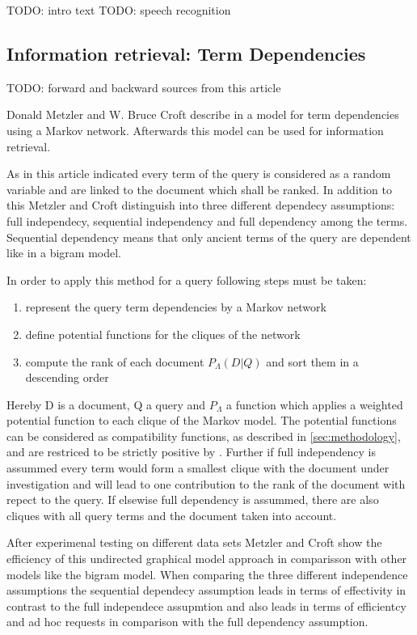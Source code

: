 TODO: intro text
TODO: speech recognition

\subsection{Information retrieval: Term Dependencies}

TODO: forward and backward sources from this article \cite{metzler2005markov}

Donald Metzler and W. Bruce Croft describe in \cite{metzler2005markov} a model for term dependencies using a Markov network. Afterwards this model can be used for information retrieval.

As in this article indicated every term of the query is considered as a random variable and are linked to the document which shall be ranked. In addition to this Metzler and Croft distinguish into three different dependecy assumptions: full independecy, sequential independency and full dependency among the terms. Sequential dependency means that only ancient terms of the query are dependent like in a bigram model.

In order to apply this method for a query following steps must be taken:
\begin{enumerate}
\item represent the query term dependencies by a Markov network
\item define potential functions for the cliques of the network
\item compute the rank of each document $P_\Lambda (D|Q)$ and sort them in a descending order
\end{enumerate}

Hereby D is a document, Q a query and $P_\Lambda$ a function which applies a weighted potential function to each clique of the Markov model. The potential functions can be considered as compatibility functions, as described in \ref{sec:methodology}, and are restriced to be strictly positive by \cite{metzler2005markov}. Further if full independency is assummed every term would form a smallest clique with the document under investigation and will lead to one contribution to the rank of the document with repect to the query. If elsewise full dependency is assummed, there are also cliques with all query terms and the document taken into account.

After experimenal testing on different data sets Metzler and Croft show the efficiency of this undirected graphical model approach in comparisson with other models like the bigram model. When comparing the three different independence assumptions the sequential dependecy assumption leads in terms of effectivity in contrast to the full independece assupmtion and also leads in terms of efficientcy and ad hoc requests in comparison with the full dependency assumption.


